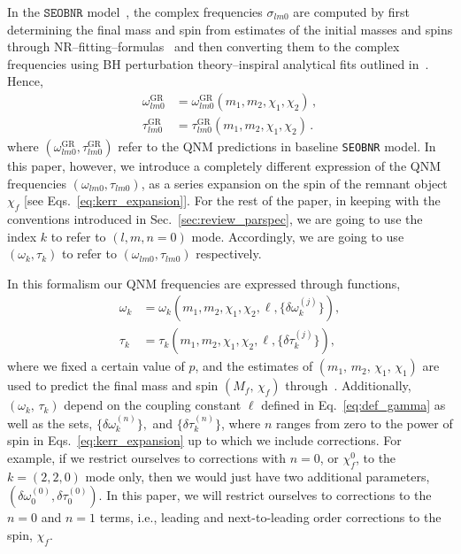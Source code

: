 \documentclass[twocolumn,
               prd,
               aps,
               superscriptaddress,
               tightenlines,
               nofootinbib,
               eqsecnum,
               amsfonts,
               amsmath,
               longbibliography]{revtex4-1}
\newcommand{\SEOB}{\texttt{SEOBNR}}
\begin{document}
In the $\SEOB$ model~\cite{Mihaylov:2021bpf}, the complex frequencies $\sigma_{l m 0}$ are computed by first determining the final mass and spin from estimates of the initial masses and spins through NR--fitting--formulas~\cite{Taracchini:2013rva,Hofmann:2016yih} and then converting them to the complex frequencies using BH perturbation theory--inspiral analytical fits outlined in~\cite{Berti:2005ys,Berti:2009kk}. Hence,
%
\begin{subequations}
\begin{align}
\omega_{l m 0}^{\text{GR}} &= \omega_{l m 0}^{\text{GR}}(m_1, m_2, \chi_1, \chi_2)\,,\\
\tau _{l m 0}^{\text{GR}} &= \tau _{l m 0}^{\text{GR}}(m_1, m_2, \chi_1, \chi_2)\,.
\end{align}
\end{subequations}
%
where $(\omega_{l m 0}^{\text{GR}}, \tau_{l m 0}^{\text{GR}} )$ refer to the
QNM predictions in baseline \SEOB{} model.
%
In this paper, however, we introduce a completely different expression of the
QNM frequencies $(\omega_{l m 0}, \tau_{l m 0})$, as a series expansion on the
spin of the remnant object $\chi_f$ [see Eqs.~\eqref{eq:kerr_expansion}].
%
For the rest of the paper, in keeping with the conventions introduced in
Sec.~\ref{sec:review_parspec}, we are going to use the index $k$ to refer to
$(l, m,n=0)$ mode. Accordingly, we are going to use $(\omega_k, \tau _k)$ to
refer to $(\omega_{l m 0}, \tau _{l m 0})$ respectively.

In this formalism our QNM frequencies are expressed through functions,
%
\begin{subequations}
\begin{align}
\omega_k &= \omega_k(m_1, m_2, \chi_1, \chi_2,\ell, \{\delta \omega_k^{(j)}\}),\\
\tau_k   &= \tau _k(m_1, m_2, \chi_1, \chi_2, \ell, \{\delta \tau_k^{(j)}\}),
\end{align}
\end{subequations}
%
where we fixed a certain value of $p$, and the estimates of $(m_1,\, m_2,\, \chi_1,\, \chi_1)$ are used to predict
the final mass and spin $(M_f,\, \chi_f)$ through~\cite{Taracchini:2013rva,Hofmann:2016yih}.
%
%
Additionally, $(\omega_k,\, \tau_k)$ depend on the coupling constant $\ell$
defined in Eq.~\eqref{eq:def_gamma} as well as the sets, $\{\delta
\omega_k^{(n)}\},$ and $\{\delta \tau_k^{(n)}\}$, where $n$ ranges from zero to
the power of spin in Eqs.~\eqref{eq:kerr_expansion} up to which we include
corrections.
%
For example, if we restrict ourselves to corrections with $n=0$, or
$\chi_f^0$, to the $k=(2,2,0)$ mode only, then we would just have two
additional parameters, $(\delta \omega_0^{(0)}, \delta \tau_0^{(0)})$.
%
In this paper, we will restrict ourselves to corrections to the $n=0$ and
$n=1$ terms, i.e., leading and next-to-leading order corrections to the spin,
$\chi_f$.
\end{document}

